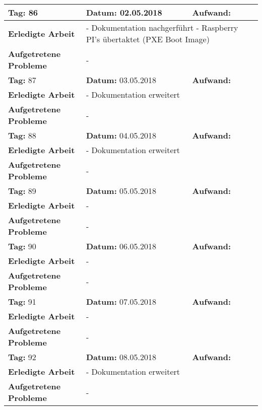 \begin{longtable}{|p{5cm}|p{5cm}|p{6cm}|}
\rowcolor{heading}\textbf{Tag:} 86 & \textbf{Datum:} 02.05.2018 & \textbf{Aufwand:} \\ \hline
\textbf{Erledigte Arbeit} & \multicolumn{2}{p{11cm}|}{- Dokumentation nachgerführt \newline
- Raspberry PI's übertaktet (PXE Boot Image)} \\ \hline
\textbf{Aufgetretene Probleme} & \multicolumn{2}{p{11cm}|}{-} \\ \hline
\rowcolor{heading}\textbf{Tag:} 87 & \textbf{Datum:} 03.05.2018 & \textbf{Aufwand:} \\ \hline
\textbf{Erledigte Arbeit} & \multicolumn{2}{p{11cm}|}{- Dokumentation erweitert} \\ \hline
\textbf{Aufgetretene Probleme} & \multicolumn{2}{p{11cm}|}{-} \\ \hline
\rowcolor{heading}\textbf{Tag:} 88 & \textbf{Datum:} 04.05.2018 & \textbf{Aufwand:} \\ \hline
\textbf{Erledigte Arbeit} & \multicolumn{2}{p{11cm}|}{- Dokumentation erweitert} \\ \hline
\textbf{Aufgetretene Probleme} & \multicolumn{2}{p{11cm}|}{-} \\ \hline
\rowcolor{heading}\textbf{Tag:} 89 & \textbf{Datum:} 05.05.2018 & \textbf{Aufwand:} \\ \hline
\textbf{Erledigte Arbeit} & \multicolumn{2}{p{11cm}|}{-} \\ \hline
\textbf{Aufgetretene Probleme} & \multicolumn{2}{p{11cm}|}{-} \\ \hline
\rowcolor{heading}\textbf{Tag:} 90 & \textbf{Datum:} 06.05.2018 & \textbf{Aufwand:} \\ \hline
\textbf{Erledigte Arbeit} & \multicolumn{2}{p{11cm}|}{-} \\ \hline
\textbf{Aufgetretene Probleme} & \multicolumn{2}{p{11cm}|}{-} \\ \hline
\rowcolor{heading}\textbf{Tag:} 91 & \textbf{Datum:} 07.05.2018 & \textbf{Aufwand:} \\ \hline
\textbf{Erledigte Arbeit} & \multicolumn{2}{p{11cm}|}{-} \\ \hline
\textbf{Aufgetretene Probleme} & \multicolumn{2}{p{11cm}|}{-} \\ \hline
\rowcolor{heading}\textbf{Tag:} 92 & \textbf{Datum:} 08.05.2018 & \textbf{Aufwand:} \\ \hline
\textbf{Erledigte Arbeit} & \multicolumn{2}{p{11cm}|}{- Dokumentation erweitert} \\ \hline
\textbf{Aufgetretene Probleme} & \multicolumn{2}{p{11cm}|}{-} \\ \hline

\end{longtable}
